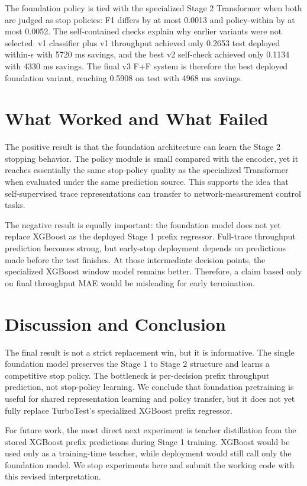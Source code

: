 \documentclass[10pt,twocolumn]{article}
\newcommand{\eps}{\epsilon}
\begin{document}
The foundation policy is tied with the specialized Stage 2 Transformer when both are judged as stop policies: F1 differs by at most 0.0013 and policy-within by at most 0.0052. The self-contained checks explain why earlier variants were not selected. v1 classifier plus v1 throughput achieved only 0.2653 test deployed within-$\eps$ with 5720 ms savings, and the best v2 self-check achieved only 0.1134 with 4330 ms savings. The final v3 F+F system is therefore the best deployed foundation variant, reaching 0.5908 on test with 4968 ms savings.

\section{What Worked and What Failed}
The positive result is that the foundation architecture can learn the Stage 2 stopping behavior. The policy module is small compared with the encoder, yet it reaches essentially the same stop-policy quality as the specialized Transformer when evaluated under the same prediction source. This supports the idea that self-supervised trace representations can transfer to network-measurement control tasks.

The negative result is equally important: the foundation model does not yet replace XGBoost as the deployed Stage 1 prefix regressor. Full-trace throughput prediction becomes strong, but early-stop deployment depends on predictions made before the test finishes. At those intermediate decision points, the specialized XGBoost window model remains better. Therefore, a claim based only on final throughput MAE would be misleading for early termination.

\section{Discussion and Conclusion}
The final result is not a strict replacement win, but it is informative. The single foundation model preserves the Stage 1 to Stage 2 structure and learns a competitive stop policy. The bottleneck is per-decision prefix throughput prediction, not stop-policy learning. We conclude that foundation pretraining is useful for shared representation learning and policy transfer, but it does not yet fully replace TurboTest's specialized XGBoost prefix regressor.

For future work, the most direct next experiment is teacher distillation from the stored XGBoost prefix predictions during Stage 1 training. XGBoost would be used only as a training-time teacher, while deployment would still call only the foundation model. We stop experiments here and submit the working code with this revised interpretation.

\balance
\end{document}
